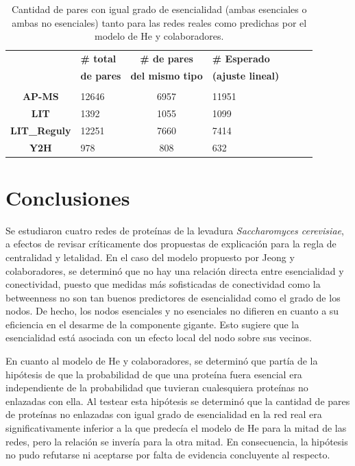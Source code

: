 \documentclass[%
 reprint,
 amsmath,amssymb,
 aps,
]{revtex4-1}
\def \sc {\em Saccharomyces cerevisiae}
\begin{document}
\begin{table}[h]
\begin{ruledtabular}
\begin{tabular}{ c l c l c l c }  
{}&{\bf          \# total }&{\bf  \# de pares }&{\bf \# Esperado }\\
{}&{\bf          de pares}&{\bf  del mismo tipo }&{\bf  (ajuste lineal)  }\\\hline\\
{\bf AP-MS        }&{           12646           }&{             6957 }&{  11951 }\\
{\bf LIT            }&{          1392          }&{              1055  }&{ 1099}\\
{\bf LIT\_Reguly      }&{        12251             }&{ 7660   }&{ 7414}  \\
{\bf Y2H}&{978 }&{808}&{632}\\

\end{tabular}
\end{ruledtabular}
\caption{Cantidad de pares con igual grado de esencialidad (ambas esenciales o ambas no esenciales) tanto para las redes reales como predichas por el modelo de He y colaboradores.}
\label{tabla4}
\end{table}

\section{Conclusiones}

Se estudiaron cuatro redes de prote\'inas de la levadura {\sc}, a efectos de revisar cr\'iticamente dos propuestas de explicaci\'on para la regla de centralidad y letalidad. En el caso del modelo propuesto por Jeong y colaboradores, se determin\'o que no hay una relaci\'on directa entre esencialidad y conectividad, puesto que medidas m\'as sofisticadas de conectividad como la betweenness no son tan buenos predictores de esencialidad como el grado de los nodos. De hecho, los nodos esenciales y no esenciales no difieren en cuanto a su eficiencia en el desarme de la componente gigante. Esto sugiere que la esencialidad est\'a asociada con un efecto local del nodo sobre sus vecinos. 

En cuanto al modelo de He y colaboradores, se determin\'o que part\'ia de la hip\'otesis de que la probabilidad de que una prote\'ina fuera esencial era independiente de la probabilidad que tuvieran cualesquiera prote\'inas no enlazadas con ella. Al testear esta hip\'otesis se determin\'o que la cantidad de pares de prote\'inas no enlazadas con igual grado de esencialidad en la red real era significativamente inferior a la que predec\'ia el modelo de He para la mitad de las redes, pero la relaci\'on se inver\'ia para la otra mitad. En consecuencia, la hip\'otesis no pudo refutarse ni aceptarse por falta de evidencia concluyente al respecto.
\end{document}
